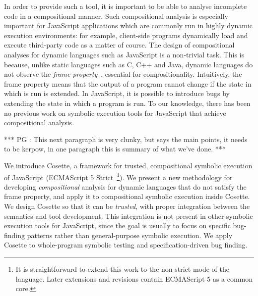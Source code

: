 \documentclass[sigconf, review]{acmart}
\newcommand{\cosette}{Cosette\xspace}
\newcommand{\pgmaxinline}[1]{ {\color{purple} *** PG : #1 ***} }
\begin{document}

In order to provide such a tool, it is important to
be able to analyse incomplete code in a compositional manner. Such
compositional analysis is especially important for JavaScript
applications which are commonly run in highly dynamic execution
environments: for example, client-side programs dynamically load and
execute third-party code as a matter of course.  The design of
compositional analyses for dynamic languages such as JavaScript 
is a non-trivial task. This is because, unlike static languages
such as C, C++ and Java, dynamic languages do not observe the
\emph{frame property}~\cite{?}, essential for
compositionality. Intuitively, the frame property means that the
output of a program cannot change if the state in which is run is
extended. In JavaScript,  it is possible to introduce bugs by 
extending the state in which a program is run. To our knowledge, 
there has been no previous work on symbolic execution tools for
JavaScript that achieve compositional analysis.


\pgmaxinline{This next paragraph is very clunky, but says the main
  points, it needs to be kerpow, in one paragraph this is summary of
  what we've done. }

  We introduce \cosette, a framework for trusted, compositional 
  symbolic execution of JavaScript
  (ECMAScript 5 Strict~\cite{ecma}\footnote{It is straightforward to
    extend this work to the non-strict mode of the language. Later extensions and
    revisions contain ECMAScript 5 as a common core.}).  We present a
  new methodology for developing {\em compositional} analysis for dynamic
  languages that do not satisfy the frame property, and apply it to
  {compositional} symbolic execution inside Cosette.  We design
  Cosette so that it can be {\em trusted}, with proper integration
  between the semantics and tool development. This integration is not
  present in other symbolic execution tools for JavaScript, since the
  goal is usually to focus on specific bug-finding patterns rather
  than general-purpose symbolic execution.  We apply Cosette to
  whole-program symbolic testing and specification-driven bug finding.
\end{document}
